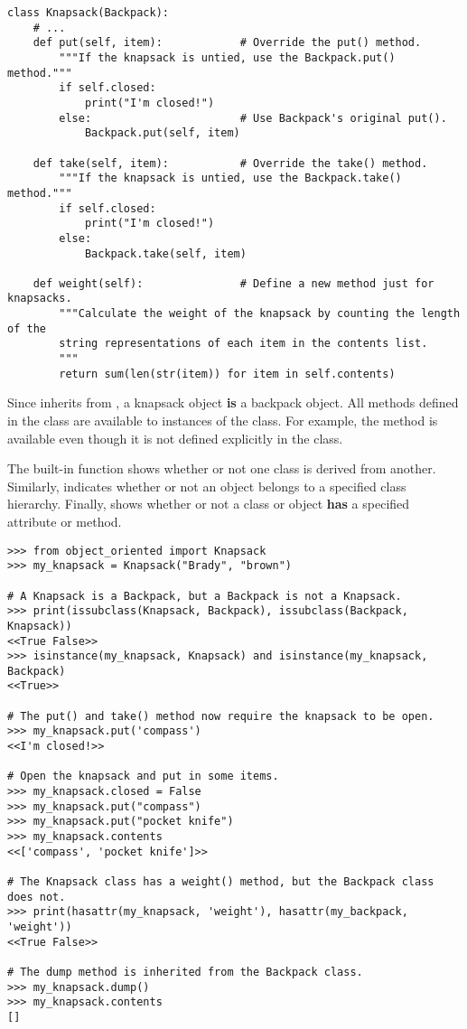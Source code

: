 \begin{lstlisting}
class Knapsack(Backpack):
    # ...
    def put(self, item):            # Override the put() method.
        """If the knapsack is untied, use the Backpack.put() method."""
        if self.closed:
            print("I'm closed!")
        else:                       # Use Backpack's original put().
            Backpack.put(self, item)

    def take(self, item):           # Override the take() method.
        """If the knapsack is untied, use the Backpack.take() method."""
        if self.closed:
            print("I'm closed!")
        else:
            Backpack.take(self, item)

    def weight(self):               # Define a new method just for knapsacks.
        """Calculate the weight of the knapsack by counting the length of the
        string representations of each item in the contents list.
        """
        return sum(len(str(item)) for item in self.contents)
\end{lstlisting}

Since  inherits from , a knapsack object \textbf{is} a backpack object.
All methods defined in the  class are available to instances of the  class.
For example, the  method is available even though it is not defined explicitly in the  class.

The built-in function  shows whether or not one class is derived from another.
Similarly,  indicates whether or not an object belongs to a specified class hierarchy.
Finally,  shows whether or not a class or object \textbf{has} a specified attribute or method.

\begin{lstlisting}
>>> from object_oriented import Knapsack
>>> my_knapsack = Knapsack("Brady", "brown")

# A Knapsack is a Backpack, but a Backpack is not a Knapsack.
>>> print(issubclass(Knapsack, Backpack), issubclass(Backpack, Knapsack))
<<True False>>
>>> isinstance(my_knapsack, Knapsack) and isinstance(my_knapsack, Backpack)
<<True>>

# The put() and take() method now require the knapsack to be open.
>>> my_knapsack.put('compass')
<<I'm closed!>>

# Open the knapsack and put in some items.
>>> my_knapsack.closed = False
>>> my_knapsack.put("compass")
>>> my_knapsack.put("pocket knife")
>>> my_knapsack.contents
<<['compass', 'pocket knife']>>

# The Knapsack class has a weight() method, but the Backpack class does not.
>>> print(hasattr(my_knapsack, 'weight'), hasattr(my_backpack, 'weight'))
<<True False>>

# The dump method is inherited from the Backpack class.
>>> my_knapsack.dump()
>>> my_knapsack.contents
[]
\end{lstlisting}

